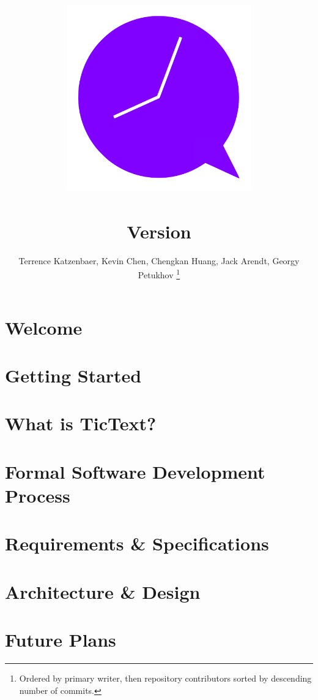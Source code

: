 \documentclass[11pt, titlepage]{article} %
\title{
\includegraphics[width=8cm]{icon}\\
\kDocTitle\\
\large{Version \kDocVersion}
}
\author{
	Terrence Katzenbaer, Kevin Chen, Chengkan Huang, Jack Arendt, Georgy Petukhov
	\footnote{Ordered by primary writer, then repository contributors sorted by descending number of commits.}
}
\begin{document}
\maketitle
\tableofcontents

\clearpage
\section{Welcome}


\section{Getting Started}


\clearpage
\section{What is TicText?}


\clearpage
\section{Formal Software Development Process}


\clearpage
\section{Requirements \& Specifications}


\clearpage
\section{Architecture \& Design}


\clearpage
\section{Future Plans}

\end{document}
